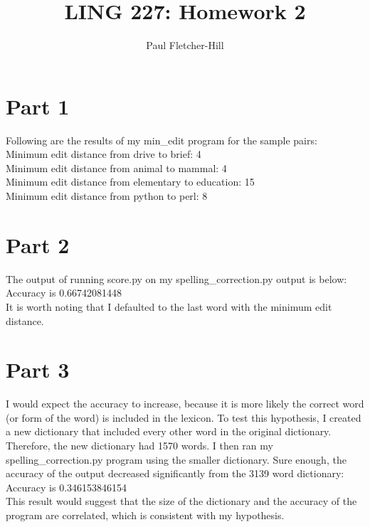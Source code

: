 \documentclass[a4paper,10pt]{article}
\newcommand{\br}{\\[10pt]}
\begin{document}
  \title{LING 227: Homework 2}
  \author{Paul Fletcher-Hill}
  \maketitle


  \section*{Part 1}

  Following are the results of my min\_edit program for the sample pairs:
  \br
  Minimum edit distance from drive to brief: 4\\
  Minimum edit distance from animal to mammal: 4\\
  Minimum edit distance from elementary to education: 15\\
  Minimum edit distance from python to perl: 8
  
  \section*{Part 2}
  The output of running score.py on my spelling\_correction.py output is below:
  \br
  Accuracy is 0.66742081448
  \br
  It is worth noting that I defaulted to the last word with the minimum edit distance.

  \section*{Part 3}
  I would expect the accuracy to increase, because it is more likely the correct word (or form of the word) is included in the lexicon. To test this hypothesis, I created a new dictionary that included every other word in the original dictionary. Therefore, the new dictionary had 1570 words. I then ran my spelling\_correction.py program using the smaller dictionary. Sure enough, the accuracy of the output decreased significantly from the 3139 word dictionary:
  \br
  Accuracy is 0.346153846154
  \br
  This result would suggest that the size of the dictionary and the accuracy of the program are correlated, which is consistent with my hypothesis.
\end{document}
